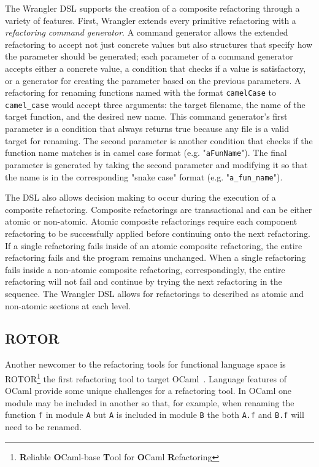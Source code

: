 The Wrangler DSL supports the creation of a composite refactoring through a variety of features. First, Wrangler extends every primitive refactoring with a \textit{refactoring command generator}. A command generator allows the extended refactoring to accept not just concrete values but also structures that specify how the parameter should be generated; each parameter of a command generator accepts either a concrete value, a condition that checks if a value is satisfactory, or a generator for creating the parameter based on the previous parameters. A refactoring for renaming functions named with the format \texttt{camelCase} to \texttt{camel\_case} would accept three arguments: the target filename, the name of the target function, and the desired new name. This command generator's first parameter is a condition that always returns true because any file is a valid target for renaming. The second parameter is another condition that checks if the function name matches is in camel case format (e.g. "\texttt{aFunName}"). The final parameter is generated by taking the second parameter and modifying it so that the name is in the corresponding "snake case" format (e.g. "\texttt{a\_fun\_name}"). 

The DSL also allows decision making to occur during the execution of a composite refactoring. Composite refactorings are transactional and can be either atomic or non-atomic. Atomic composite refactorings require each component refactoring to be successfully applied before continuing onto the next refactoring. If a single refactoring fails inside of an atomic composite refactoring, the entire refactoring fails and the program remains unchanged. When a single refactoring fails inside a non-atomic composite refactoring, correspondingly, the entire refactoring will not fail and continue by trying the next refactoring in the sequence. The Wrangler DSL allows for refactorings to described as atomic and non-atomic sections at each level.  

\subsection{ROTOR}

Another newcomer to the refactoring tools for functional language space is ROTOR\footnote{\textbf{R}eliable \textbf{O}Caml-base \textbf{T}ool for \textbf{O}Caml \textbf{R}efactoring} the first refactoring tool to target OCaml~\citep{rotor}. Language features of OCaml provide some unique challenges for a refactoring tool. In OCaml one module may be included in another so that, for example, when renaming the function \texttt{f} in module \texttt{A} but \texttt{A} is included in module \texttt{B} the both \texttt{A.f} and \texttt{B.f} will need to be renamed. 

